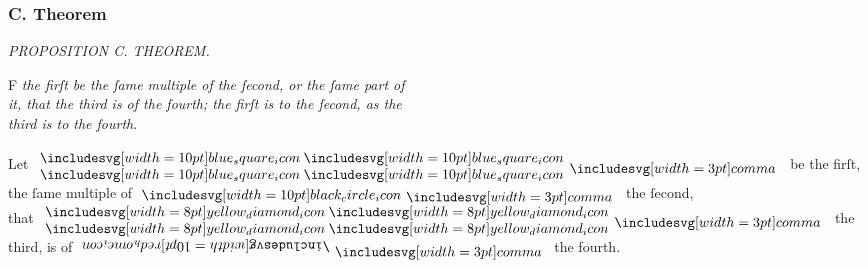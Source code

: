 \documentclass[11pt,preview]{standalone}
\begin{document}
\subsubsection{C. Theorem}

\newcommand{\rredhome}{\rotatebox[origin=c]{180}{$\redhome$}}
\newcommand{\bluesquares}{\hspace{-1ex}\begin{array}{c} \bluesquare\hspace{-0.75ex}\bluesquare \\ \bluesquare\hspace{-0.75ex}\bluesquare \end{array}\hspace{-1ex}}
\newcommand{\yellowdiamonds}{\hspace{-1ex}\begin{array}{c} \yellowdiamond\hspace{-0.75ex}\yellowdiamond \\ \yellowdiamond\hspace{-0.75ex}\yellowdiamond \end{array}\hspace{-1ex}}

\begin{minipage}{\textwidth}
    \begin{center}
        \textit{PROPOSITION C. THEOREM.}\label{book5prC} \\
    \end{center}

    \hfill

    \begin{center}
        \raggedright \lettrine[lines=3, loversize=1, nindent=0pt]{}{}F \textit{the firſt be the ſame multiple of the ſecond, or the ſame part of\\ it, that the third is of the fourth; the firſt is to the ſecond, as the\\ third is to the fourth}.
    \end{center}
\end{minipage}

\hfill

\hfill

\begin{center}
    Let $\bluesquares \bcomma$ be the firſt, the ſame multiple of $\blackcircle \bcomma$ the ſecond,\\
    that $\yellowdiamonds \bcomma$ the third, is of $\rredhome \bcomma$ the fourth.
\end{center}
\end{document}
